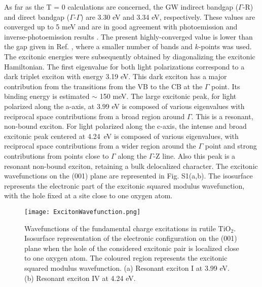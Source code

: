 \documentclass[aps,prl,twocolumn,amsfonts,nobibnotes,superscriptaddress,showpacs]{revtex4-1}
\begin{document}
As far as the T = 0 calculations are concerned, the GW indirect bandgap ($\Gamma$-R) and direct bandgap ($\Gamma$-$\Gamma$) are 3.30 eV and 3.34 eV, respectively. These values are converged up to 5 meV and are in good agreement with photoemission and inverse-photoemission results \cite{tezuka1994photoemission}. The present highly-converged value is lower than the gap given in Ref. \cite{chiodo2010self}, where a smaller number of bands and $k$-points was used. The excitonic energies were subsequently obtained by diagonalizing the excitonic Hamiltonian. The first eigenvalue for both light polarizations correspond to a dark triplet exciton with energy 3.19 eV. This dark exciton has a major contribution from the transitions from the VB to the CB at the $\Gamma$ point. Its binding energy is estimated $\sim$ 150 meV. The large excitonic peak, for light polarized along the a-axis, at 3.99 eV is composed of various eigenvalues with reciprocal space contributions from a broad region around $\Gamma$. This is a resonant, non-bound exciton. For light polarized along the c-axis, the intense and broad excitonic peak centered at 4.24~eV is composed of various eigenvalues, with reciprocal space contributions from a wider region around the $\Gamma$ point and strong contributions from points close to $\Gamma$ along the $\Gamma$-Z line. Also this peak is a resonant non-bound exciton, retaining a bulk delocalized character. 
The excitonic wavefunctions on the (001) plane are represented in Fig. S1(a,b). The isosurface represents the electronic part of the excitonic squared modulus wavefunction, with the hole fixed at a site close to one oxygen atom. 

\begin{figure}[t]
	\begin{center}
		\texttt{[image: ExcitonWavefunction.png]}
		\caption{Wavefunctions of the fundamental charge excitations in rutile TiO$_2$. Isosurface representation of the electronic configuration on the (001) plane when the hole of the considered excitonic pair is localized close to one oxygen atom. The coloured region represents the excitonic squared modulus wavefunction. (a) Resonant exciton I at 3.99 eV. (b) Resonant exciton IV at 4.24 eV.}
		\label{fig:ExcitonWave}
	\end{center}
\end{figure}
\end{document}
